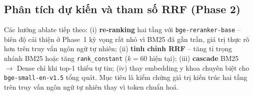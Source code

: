 \subsection{Phân tích dự kiến và tham số RRF (Phase 2)}
Các hướng ablate tiếp theo: (i) \textbf{re-ranking} hai tầng với
\texttt{bge-reranker-base} -- biên độ cải thiện ở Phase~1 kỳ vọng rất nhỏ vì BM25
đã gần trần, giá trị thực rõ hơn trên truy vấn ngôn ngữ tự nhiên;
(ii) \textbf{tinh chỉnh RRF} -- tăng tỉ trọng nhánh BM25 hoặc tăng
\texttt{rank\_constant} ($k=60$ hiện tại); (iii) \textbf{cascade}
BM25 $\rightarrow$ Dense chỉ khi top-1 thiếu tự tin; (iv) thay embedding y khoa
chuyên biệt cho \texttt{bge-small-en-v1.5} tổng quát. Mục tiêu là kiểm chứng giá
trị kiến trúc hai tầng trên truy vấn ngôn ngữ tự nhiên thay vì token chuẩn hoá.
